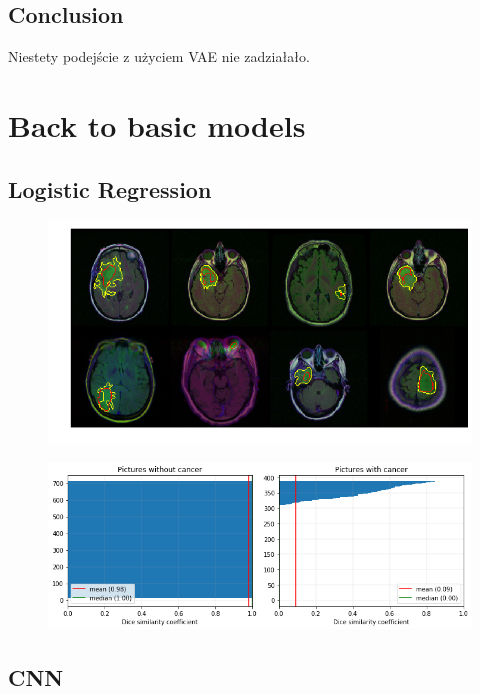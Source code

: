 \subsection{Conclusion}

Niestety podejście z użyciem VAE nie zadziałało.

\section{Back to basic models}

\subsection{Logistic Regression}

\begin{figure}[h!]
    \centering
    \includegraphics[width=1.0\textwidth]{images/logreg_mask}
    \caption{}
    \label{fig:logreg_mask}
\end{figure}

\begin{figure}[h!]
    \centering
    \includegraphics[width=1.0\textwidth]{images/logreg_dsc}
    \caption{}
    \label{fig:logreg_dsc}
\end{figure}

\subsection{CNN}

